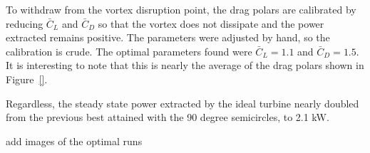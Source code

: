 To withdraw from the vortex disruption point, the drag
polars are calibrated by reducing $\bar C_L $ and $\bar C_D$ so that the 
vortex does not dissipate and the power extracted remains positive. The
parameters were adjusted by hand, so the calibration is crude. The
optimal parameters found were $\bar C_L = 1.1$ and $\bar C_D = 1.5$. It
is interesting to note that this is nearly the average of the drag
polars shown in Figure~\ref{}. 

Regardless, the steady state power extracted by the ideal turbine nearly 
doubled from the previous best attained with the 90 degree semicircles,
to 2.1 kW. 


add images of the optimal runs
